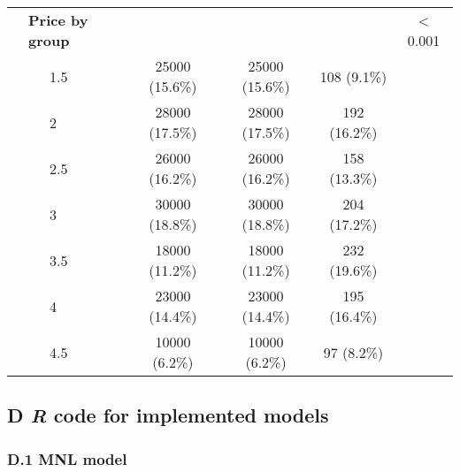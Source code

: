 \documentclass[11pt,]{article}
\begin{document}
\begin{table}[!htbp]
\begin{tabular}{@{\extracolsep{5pt}}llcccc}
 & \textbf{Price by group} &  &  &  & < 0.001\\
 & ~~~1.5 & 25000 (15.6\%) & 25000 (15.6\%) & 108 (9.1\%) & \\
 & ~~~2 & 28000 (17.5\%) & 28000 (17.5\%) & 192 (16.2\%) & \\
 & ~~~2.5 & 26000 (16.2\%) & 26000 (16.2\%) & 158 (13.3\%) & \\
 & ~~~3 & 30000 (18.8\%) & 30000 (18.8\%) & 204 (17.2\%) & \\
 & ~~~3.5 & 18000 (11.2\%) & 18000 (11.2\%) & 232 (19.6\%) & \\
 & ~~~4 & 23000 (14.4\%) & 23000 (14.4\%) & 195 (16.4\%) & \\
 & ~~~4.5 & 10000 (6.2\%) & 10000 (6.2\%) & 97 (8.2\%) & \\
\hline
\end{tabular}
\end{table}

\FloatBarrier

\newpage

\hypertarget{d-r-code-for-implemented-models}{%
\subsection*{\texorpdfstring{D \emph{R} code for implemented
models}{D R code for implemented models}}\label{d-r-code-for-implemented-models}}

\hypertarget{d.1-mnl-model}{%
\subsubsection*{D.1 MNL model}\label{d.1-mnl-model}}
\end{document}
